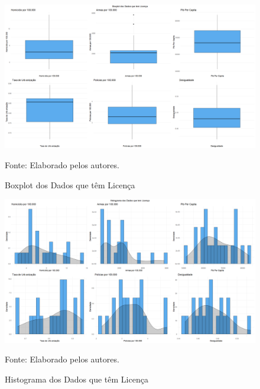 \documentclass[12pt]{article}
\begin{document}
\begin{figure}[H]
    \centering
    \caption{Boxplot dos Dados que têm Licença}
    \includegraphics[width=1.0\textwidth]{Boxplot dos Dados que tem Licença.png}
    \label{fig:Boxplot dos Dados que tem Licença}
    
    \footnotesize{Fonte: Elaborado pelos autores.}
\end{figure}

\begin{figure}[H]
    \centering
    \caption{Histograma dos Dados que têm Licença}
    \includegraphics[width=1.0\textwidth]{Histograma dos Dados que tem Licença.png}
    \label{fig:Histograma dos Dados que tem Licença}
    
    \footnotesize{Fonte: Elaborado pelos autores.}
\end{figure}
\end{document}
